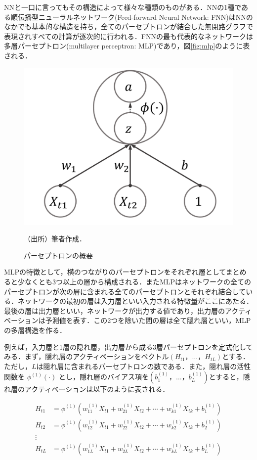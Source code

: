 \documentclass[a4paper，11pt]{jsarticle}
\begin{document}
NNと一口に言ってもその構造によって様々な種類のものがある．NNの1種である順伝播型ニューラルネットワーク(Feed-forward Neural Network: FNN)はNNのなかでも基本的な構造を持ち，全てのパーセプトロンが結合した無閉路グラフで表現されすべての計算が逐次的に行われる．FNNの最も代表的なネットワークは多層パーセプトロン(multilayer perceptron: MLP)であり，図\ref{fig:mlp}のように表される．

\begin{figure}[tbp]
  \centering
  \caption{パーセプトロンの概要}
  \label{fig:perceptron}
  \includegraphics[width=0.4\linewidth]{./img/_ann_unit.pdf}
  \begin{threeparttable}  
  \begin{tablenotes}
    \item[]（出所）筆者作成．
  \end{tablenotes}
  \end{threeparttable}  
\end{figure}

MLPの特徴として，横のつながりのパーセプトロンをそれぞれ層としてまとめると少なくとも3つ以上の層から構成される．またMLPはネットワークの全てのパーセプトロンが次の層に含まれる全てのパーセプトロンとそれぞれ結合している．ネットワークの最初の層は入力層といい入力される特徴量がここにあたる．最後の層は出力層といい，ネットワークが出力する値であり，出力層のアクティベーションは予測値を表す．この2つを除いた間の層は全て隠れ層といい，MLPの多層構造を作る．

例えば，入力層と1層の隠れ層，出力層から成る3層パーセプトロンを定式化してみる．まず，隠れ層のアクティベーションをベクトル$(H_{t1}，\ldots，H_{tL})$とする．ただし，$L$は隠れ層に含まれるパーセプトロンの数である．また，隠れ層の活性関数を $\phi^{(1)}(\cdot)$ とし，隠れ層のバイアス項を$(b^{(1)}_1，\ldots，b^{(1)}_L)$とすると，隠れ層のアクティベーションは以下のように表される．

\begin{equation}
  \begin{split}
    H_{t1} &= \phi^{(1)} \left( w^{(1)}_{11} X_{t1} + w^{(1)}_{21} X_{t2} + \cdots + w^{(1)}_{k1} X_{tk} + b^{(1)}_1 \right) \\
    H_{t2} &= \phi^{(1)} \left( w^{(1)}_{12} X_{t1} + w^{(1)}_{22} X_{t2} + \cdots + w^{(1)}_{k2} X_{tk} + b^{(1)}_2 \right) \\
    \vdots \\
    H_{tL} &= \phi^{(1)} \left( w^{(1)}_{1L} X_{t1} + w^{(1)}_{2L} X_{t2} + \cdots + w^{(1)}_{kL} X_{tk} + b^{(1)}_L \right) \\
  \end{split}
\end{equation}
\end{document}
